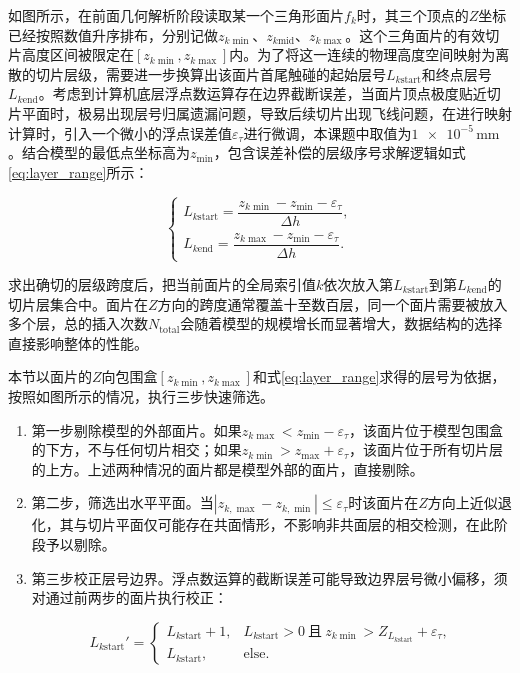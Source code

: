 如图所示，在前面几何解析阶段读取某一个三角形面片$f_{k}$时，其三个顶点的$Z$坐标已经按照数值升序排布，分别记做$z_{k\min}$、$z_{k\mathrm{mid}}$、$z_{k\max}$。这个三角面片的有效切片高度区间被限定在$[z_{k\min},z_{k\max}]$内。为了将这一连续的物理高度空间映射为离散的切片层级，需要进一步换算出该面片首尾触碰的起始层号$L_{k\mathrm{start}}$和终点层号$L_{k\mathrm{end}}$。考虑到计算机底层浮点数运算存在边界截断误差，当面片顶点极度贴近切片平面时，极易出现层号归属遗漏问题，导致后续切片出现飞线问题，在进行映射计算时，引入一个微小的浮点误差值$\varepsilon_{\tau}$进行微调，本课题中取值为$\num{1e-5}\,\mathrm{mm}$。结合模型的最低点坐标高为$z_{\min}$，包含误差补偿的层级序号求解逻辑如式\eqref{eq:layer_range}所示：

\begin{equation}
\begin{cases}
L_{k\mathrm{start}}=\dfrac{z_{k\min}-z_{\min}-\varepsilon_\tau}{\Delta h},\\[12pt]
L_{k\mathrm{end}}=\dfrac{z_{k\max}-z_{\min}-\varepsilon_\tau}{\Delta h}.
\end{cases} \label{eq:layer_range}
\end{equation}

求出确切的层级跨度后，把当前面片的全局索引值$k$依次放入第$L_{k\mathrm{start}}$到第$L_{k\mathrm{end}}$的切片层集合中。面片在$Z$方向的跨度通常覆盖十至数百层，同一个面片需要被放入多个层，总的插入次数$N_{\mathrm{total}}$会随着模型的规模增长而显著增大，数据结构的选择直接影响整体的性能。

本节以面片的$Z$向包围盒$[z_{k\min},z_{k\max}]$和式\eqref{eq:layer_range}求得的层号为依据，按照如图所示的情况，执行三步快速筛选。

\begin{enumerate}
\item 第一步剔除模型的外部面片。如果$z_{k\max}<z_{\min}-\varepsilon_{\tau}$，该面片位于模型包围盒的下方，不与任何切片相交；如果$z_{k\min}>z_{\max}+\varepsilon_{\tau}$，该面片位于所有切片层的上方。上述两种情况的面片都是模型外部的面片，直接剔除。

\item 第二步，筛选出水平平面。当$\left|z_{k,\max}-z_{k,\min}\right|\le\varepsilon_{\tau}$时该面片在$Z$方向上近似退化，其与切片平面仅可能存在共面情形，不影响非共面层的相交检测，在此阶段予以剔除。

\item 第三步校正层号边界。浮点数运算的截断误差可能导致边界层号微小偏移，须对通过前两步的面片执行校正：

\begin{equation}
L_{k\mathrm{start}}'=
\begin{cases}
L_{k\mathrm{start}}+1, & L_{k\mathrm{start}}>0\ \text{且}\ z_{k\min}>Z_{L_{k\mathrm{start}}}+\varepsilon_{\tau},\\[6pt]
L_{k\mathrm{start}}, & \text{else}.
\end{cases} \label{eq:layer_correction}
\end{equation}
\end{enumerate}

